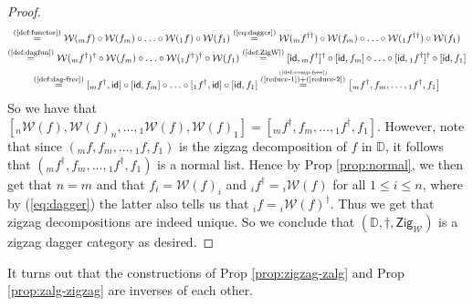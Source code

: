 \documentclass[10pt]{article}
\begin{document}
\begin{proof}
\begin{gather*}
\overset{\text{(\ref{def:functor})}}{=} \mathcal{W}({}_m f) \circ \mathcal{W}(f_m) \circ \hdots \circ \mathcal{W}({}_1 f) \circ \mathcal{W}(f_1) \overset{\text{(\ref{eq:dagger})}}{=} \mathcal{W}({}_m f^{\dagger\dagger}) \circ \mathcal{W}(f_m) \circ \hdots \circ \mathcal{W}({}_1 f^{\dagger\dagger}) \circ \mathcal{W}(f_1) \\\overset{\text{(\ref{def:dagfun})}}{=} \mathcal{W}({}_m f^\dagger)^\dagger \circ \mathcal{W}(f_m) \circ \hdots \circ \mathcal{W}({}_1 f^\dagger)^\dagger \circ \mathcal{W}(f_1)  \overset{\text{(\ref{def:ZigW})}}{=} [\mathsf{id},{}_mf^\dagger]^\dagger \circ [\mathsf{id},f_m] \circ \hdots \circ [\mathsf{id},{}_1f^\dagger]^\dagger \circ [\mathsf{id},f_1] \\ \overset{\text{(\ref{def:dag-free})}}{=} [{}_mf^\dagger,\mathsf{id}] \circ [\mathsf{id},f_m] \circ \hdots \circ [{}_1f^\dagger, \mathsf{id}]\circ [\mathsf{id},f_1] \overset{\overset{\text{(\ref{def:comp-free})}}{\text{(\ref{reduce-1})+(\ref{reduce-2})}}}{=} \left[{}_mf^\dagger, f_m, \hdots, {}_1f^\dagger, f_1 \right]
\end{gather*}
So we have that $\left[ {}_n\mathcal{W}(f), \mathcal{W}(f)_n ,\hdots, {}_1 \mathcal{W}(f),\mathcal{W}(f)_1 \right]= \left[{}_mf^\dagger, f_m, \hdots, {}_1f^\dagger, f_1 \right]$. However, note that since $({}_m f, f_m, \hdots, {}_1f, f_1)$ is the zigzag decomposition of $f$ in $\mathbb{D}$, it follows that $({}_m f^\dagger, f_m, \hdots, {}_1f^\dagger, f_1)$ is a normal list. Hence by Prop \ref{prop:normal}, we then get that $n=m$ and that $f_i = \mathcal{W}(f)_i$ and ${}_if^\dagger= {}_i\mathcal{W}(f)$ for all $1 \leq i \leq n$, where by (\ref{eq:dagger}) the latter also tells us that ${}_if= {}_i\mathcal{W}(f)^\dagger$. Thus we get that zigzag decompositions are indeed unique. So we conclude that $(\mathbb{D},\dagger,\mathsf{Zig}_\mathcal{W})$ is a zigzag dagger category as desired. 
\end{proof}

It turns out that the constructions of Prop \ref{prop:zigzag-zalg} and Prop \ref{prop:zalg-zigzag} are inverses of each other.
\end{document}
